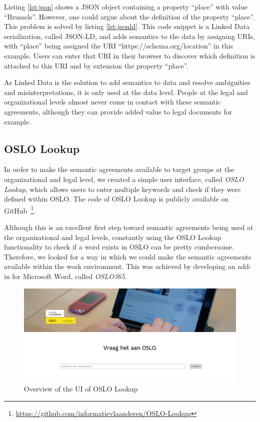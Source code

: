 \documentclass[manuscript]{acmart}
\begin{document}
Listing \ref{lst:json} shows a JSON object containing a property ``place'' with value ``Brussels''.
However, one could argue about the definition of the property ``place''.
This problem is solved by listing \ref{lst:jsonld}. 
This code snippet is a Linked Data serialization, called JSON-LD, and adds semantics to the data by assigning URIs, with ``place'' being assigned the URI ``https://schema.org/location'' in this example. 
Users can enter that URI in their browser to discover which definition is attached to this URI and by extension the property ``place''.

As Linked Data is the solution to add semantics to data and resolve ambiguities and misinterpretations, it is only used at the data level.
People at the legal and organizational levels almost never come in contact with these semantic agreements, although they can provide added value to legal documents for example.

\subsection{OSLO Lookup}

In order to make the semantic agreements available to target groups at the organizational and legal level, we created a simple user interface, called \textit{OSLO Lookup}, which allows users to enter multiple keywords and check if they were defined within OSLO.
The code of OSLO Lookup is publicly available on GitHub~\footnote{\url{https://github.com/informatievlaanderen/OSLO-Lookup}}.

Although this is an excellent first step toward semantic agreements being used at the organizational and legal levels, constantly using the OSLO Lookup functionality to check if a word exists in OSLO can be pretty cumbersome.
Therefore, we looked for a way in which we could make the semantic agreements available within the work environment. This was achieved by developing an add-in for Microsoft Word, called \textit{OSLO365}.

\begin{figure}[h]
  \centering
  \includegraphics[width=\linewidth]{images/oslo-lookup}
  \caption{Overview of the UI of OSLO Lookup}
  \label{osloLookup}
\end{figure}
\end{document}
